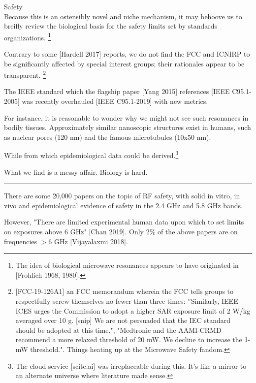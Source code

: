 \documentclass[fleqn,10pt]{article}
\begin{document}
\clearpage
\begin{multicols}{1}
{\Large Safety}\\



Because this is an ostensibly novel and niche mechanism, it may behoove us to breifly review the biological basis for the safety limits set by standards organizations. \footnote{The idea of biological microwave resonances appears to have originated in [Frohlich 1968, 1980].}

Contrary to some [Hardell 2017] reports, we do not find the FCC and ICNIRP to be significantly affected by special interest groups; their rationales appear to be transparent. 
\footnote{[FCC-19-126A1] an FCC memorandum wherein the FCC tells groups to respectfully screw themselves no fewer than three times: ''Similarly, IEEE-ICES urges the Commission to
adopt a higher SAR exposure limit of 2 W/kg averaged over 10 g. [snip] We are not persuaded that the IEC standard should be adopted at this time.", "Medtronic and the AAMI-CRMD recommend a more relaxed threshold of 20 mW. We decline to increase the 1-mW threshold.". Things heating up at the Microwave Safety fandom.}


The IEEE standard which the flagship paper [Yang 2015] references [IEEE C95.1-2005] was recently overhauled [IEEE C95.1-2019] with new metrics.

For instance, it is reasonable to wonder why we might not see such resonances in bodily tissues. Approximately similar nanoscopic structures exist in humans, such as nuclear pores (120 nm) and the famous microtubules (10x50 nm). 

While from which epidemiological data could be derived.\footnote{The cloud service [scite.ai] was irreplaceable during this. It's like a mirror to an alternate universe where literature made sense.}

What we find is a messy affair. Biology is hard.

\rule{\linewidth}{0.2pt}

There are some 20,000 papers on the topic of RF safety, with solid in vitro, in vivo and epidemiological evidence of safety in the 2.4 GHz and 5.8 GHz bands.

However, "There are limited experimental human data upon which to set limits on exposures above 6 GHz" [Chan 2019]. Only 2\% of the above papers are on frequencies $>6$ GHz [Vijayalaxmi 2018]. 


\end{multicols}
\end{document}
